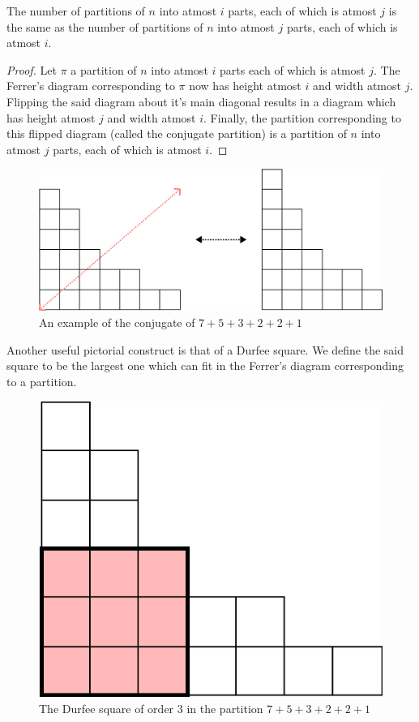 \begin{theorem}
The  number of partitions of $n$ into atmost $i$ parts, each of which is atmost $j$ is the same as the number of partitions of $n$ into atmost $j$ parts, each of which is atmost $i$. 
\end{theorem}
\begin{proof}
Let $\pi$ a partition of $n$ into atmost $i$ parts each of which is atmost $j$. The Ferrer's diagram corresponding to $\pi$ now has height atmost $i$ and width atmost $j$. Flipping the said diagram about it's main diagonal results in a diagram which has height atmost $j$ and width atmost $i$. Finally, the partition corresponding to this flipped diagram (called the conjugate partition) is a partition of $n$ into atmost $j$ parts, each of which is atmost $i$. 
\end{proof}
\begin{figure}[H]
    \centering
    \includegraphics[width=0.8\linewidth]{Images/Figure18.png}
    \caption{An example of the conjugate of $7+5+3+2+2+1$}
\end{figure}
Another useful pictorial construct is that of a Durfee square. We define the said square to be the largest one which can fit in the Ferrer’s diagram corresponding to a partition.
\begin{figure}[H]
    \centering
    \includegraphics[width=0.5\linewidth]{Images/Figure19.png}
    \caption{The Durfee square of order $3$ in the partition $7+5+3+2+2+1$}
    \label{DurfeeExample}
\end{figure}
